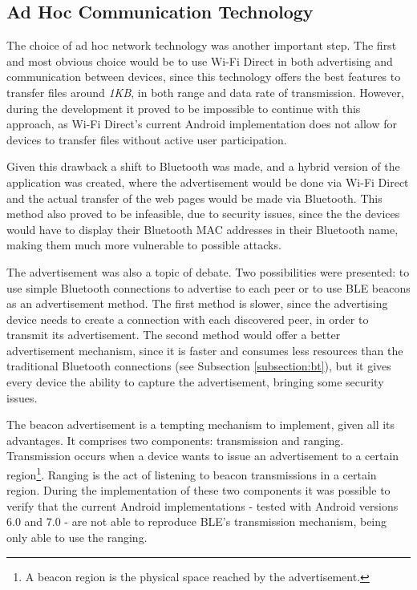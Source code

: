\subsection{Ad Hoc Communication Technology}

The choice of ad hoc network technology was another important step. The first and most obvious choice would be to use Wi-Fi Direct in both advertising and communication between devices, since this technology offers the best features to transfer files around \textit{1KB}, in both range and data rate of transmission. However, during the development it proved to be impossible to continue with this approach, as Wi-Fi Direct's current Android implementation does not allow for devices to transfer files without active user participation.

Given this drawback a shift to Bluetooth was made, and a hybrid version of the application was created, where the advertisement would be done via Wi-Fi Direct and the actual transfer of the web pages would be made via Bluetooth. This method also proved to be infeasible, due to security issues, since the the devices would have to display their Bluetooth MAC addresses in their Bluetooth name, making them much more vulnerable to possible attacks.

The advertisement was also a topic of debate. Two possibilities were presented: to use simple Bluetooth connections to advertise to each peer or to use \gls{BLE} beacons as an advertisement method. The first method is slower, since the advertising device needs to create a connection with each discovered peer, in order to transmit its advertisement. The second method would offer a better advertisement mechanism, since it is faster and consumes less resources than the traditional Bluetooth connections (see Subsection \ref{subsection:bt}), but it gives every device the ability to capture the advertisement, bringing some security issues.

The beacon advertisement is a tempting mechanism to implement, given all its advantages. It comprises two components: transmission and ranging. Transmission occurs when a device wants to issue an advertisement to a certain region\footnote{A beacon region is the physical space reached by the advertisement.}. Ranging is the act of listening to beacon transmissions in a certain region. During the implementation of these two components it was possible to verify that the current Android implementations - tested with Android versions 6.0 and 7.0 - are not able to reproduce \gls{BLE}'s transmission mechanism, being only able to use the ranging.

